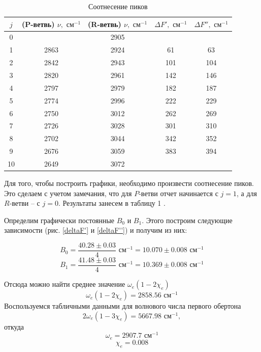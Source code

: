 \begin{table}
	\centering
	\begin{tabular}{|c|c|c||c|c|}
		\hline
		$j$ & (P-ветвь) $\nu, \text{ см}^{-1}$ & (R-ветвь) $\nu, \text{ см}^{-1}$ & $\Delta F', \text{ см}^{-1}$ & $\Delta F'', \text{ см}^{-1}$ \\
		\hline 
		0 &  & 2905 &  &  \\ 
		\hline 
		1 & 2863 & 2924 & 61 & 63 \\ 
		\hline 
		2 & 2842 & 2943 & 101 & 104 \\ 
		\hline 
		3 & 2820 & 2961 & 142 & 146 \\ 
		\hline 
		4 & 2797 & 2979 & 182 & 187 \\ 
		\hline 
		5 & 2774 & 2996 & 222 & 229 \\ 
		\hline 
		6 & 2750 & 3012 & 262 & 269 \\ 
		\hline 
		7 & 2726 & 3028 & 301 & 310 \\ 
		\hline 
		8 & 2702 & 3044 & 342 & 352 \\ 
		\hline 
		9 & 2676 & 3059 & 383 & 394 \\ 
		\hline 
		10 & 2649 & 3072 &  &  \\ 
		\hline 
	\end{tabular}
	\label{table:peaks}
	\caption{Соотнесение пиков}
\end{table} 

Для того, чтобы построить графики, необходимо произвести соотнесение пиков. Это сделаем с учетом замечания, что для $P$-ветви отчет начинается с $j=1$, а для $R$-ветви -- с $j=0$. Результаты занесем в таблицу 
1
.

Определим графически постоянные $B_0$ и $B_1$. Этого построим следующие зависимости (рис. \ref{deltaF'} и \ref{deltaF''}) и получим из них:

\begin{equation}
B_0 = \dfrac{40.28 \pm 0.03}{4} \text{ см}^{-1} = 10.070 \pm 0.008 \text{ см$^{-1}$}
\end{equation}
\begin{equation}
B_1 = \dfrac{41.48 \pm 0.03}{4} \text{ см}^{-1} = 10.369 \pm 0.008 \text{ см$^{-1}$}
\end{equation}

Отсюда можно найти среднее значение $\omega_e(1-2\chi_e)$
\begin{equation}
\omega_e(1-2\chi_e) = 
2858.56
\text{ см$^{-1}$}
\end{equation}
Воспользуемся табличными данными для волнового числа первого обертона $$2\omega_e(1-3\chi_e) = 5667.98 \text{ см$^{-1}$},$$ откуда
\begin{equation}
\omega_e = 
2907.7
\text{ см$^{-1}$}
\end{equation}
\begin{equation}
\chi_e = 
0.008
\end{equation}

